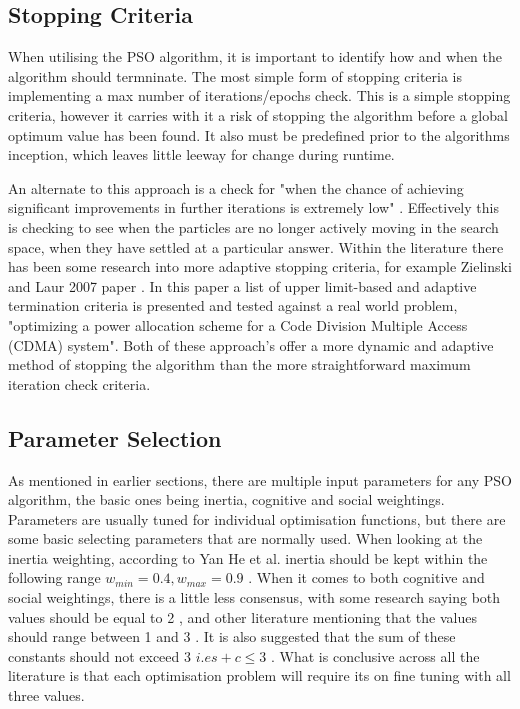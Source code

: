 \documentclass[oneside,12pt]{book}
\begin{document}
\subsection{Stopping Criteria}
When utilising the PSO algorithm, it is important to identify how and when the algorithm should termninate. The most simple form of stopping criteria is implementing a max number of iterations/epochs check. This is a simple stopping criteria, however it carries with it a risk of stopping the algorithm before a global optimum value has been found. It also must be predefined prior to the algorithms inception, which leaves little leeway for change during runtime.

An alternate to this approach is a check for "when the chance of achieving significant improvements in further iterations is extremely low" \cite{bassimir2020self}. Effectively this is checking to see when the particles are no longer actively moving in the search space, when they have settled at a particular answer. Within the literature there has been some research into more adaptive stopping criteria, for example Zielinski and Laur 2007 paper \cite{zielinski2007stopping}. In this paper a list of upper limit-based and adaptive termination criteria is presented and tested against a real world problem, "optimizing a power allocation scheme for a Code Division Multiple Access (CDMA) system"\cite{zielinski2007stopping}. Both of these approach's offer a more dynamic and adaptive method of stopping the algorithm than the more straightforward maximum iteration check criteria. 

\subsection{Parameter Selection}
As mentioned in earlier sections, there are multiple input parameters for any PSO algorithm, the basic ones being inertia, cognitive and social weightings. Parameters are usually tuned for individual optimisation functions, but there are some basic selecting parameters that are normally used. When looking at the inertia weighting, according to Yan He et al. inertia should be kept within the following range \(w_{min} = 0.4, w_{max} = 0.9\) \cite{he2016parameters}.
When it comes to both cognitive and social weightings, there is a little less consensus, with some research saying both values should be equal to 2 \cite{kennedy_eberhart_1995}, and other literature mentioning that the values should range between 1 and 3 \cite{ZHANG20143576}. It is also suggested that the sum of these constants should not exceed 3 \(i.e s+c \leq 3\) \cite{kan2012convergence}. What is conclusive across all the literature is that each optimisation problem will require its on fine tuning with all three values. 
\end{document}
